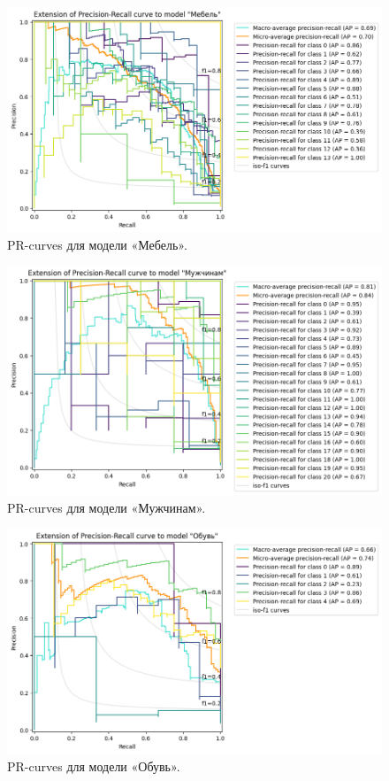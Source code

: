 \documentclass[a4paper,12pt]{extarticle}
\begin{document}
\begin{figure}[hbtp]
	\centering
	\includegraphics[scale=0.7]{pr_curves/prcurve_Мебель.png}
	\caption{PR-curves для модели «Мебель».}
	\label{fig:prcurve_Мебель}
\end{figure}

\begin{figure}[hbtp]
	\centering
	\includegraphics[scale=0.7]{pr_curves/prcurve_Мужчинам.png}
	\caption{PR-curves для модели «Мужчинам».}
	\label{fig:prcurve_Мужчинам}
\end{figure}

\begin{figure}[hbtp]
	\centering
	\includegraphics[scale=0.7]{pr_curves/prcurve_Обувь.png}
	\caption{PR-curves для модели «Обувь».}
	\label{fig:prcurve_Обувь}
\end{figure}
\end{document}
